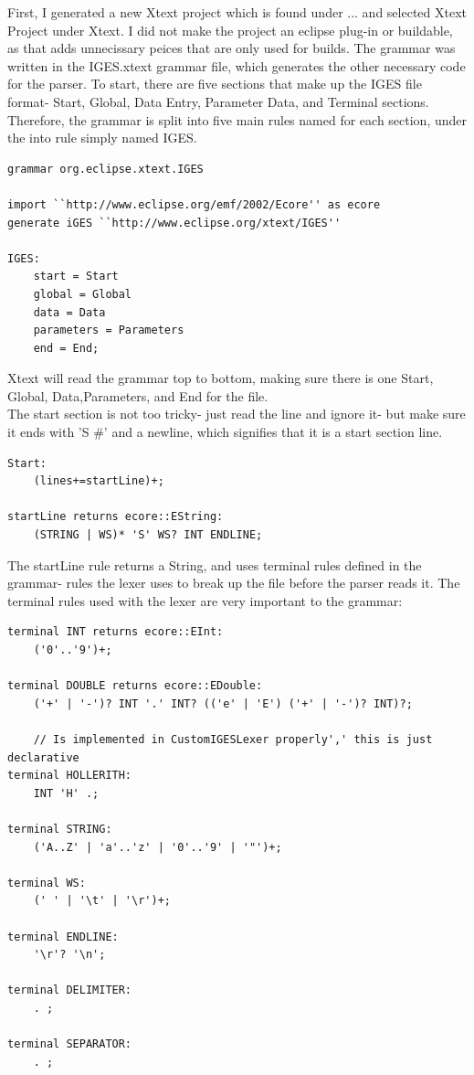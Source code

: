 First, I generated a new Xtext project which is found under ... and selected Xtext Project under Xtext. I did not make the project an eclipse plug-in or buildable, as that adds unnecissary peices that are only used for builds. The grammar was written in the IGES.xtext grammar file, which generates the other necessary code for the parser. To start, there are five sections that make up the IGES file format- Start, Global, Data Entry, Parameter Data, and Terminal sections. Therefore, the grammar is split into five main rules named for each section, under the into rule simply named IGES.
\newpage
\begin{Verbatim}
grammar org.eclipse.xtext.IGES

import ``http://www.eclipse.org/emf/2002/Ecore'' as ecore
generate iGES ``http://www.eclipse.org/xtext/IGES''

IGES:
    start = Start
    global = Global
    data = Data
    parameters = Parameters
    end = End;
\end{Verbatim}

Xtext will read the grammar top to bottom, making sure there is one Start, Global, Data,Parameters, and End for the file. \\

The start section is not too tricky- just read the line and ignore it- but make sure it ends with 'S      #' and a newline, which signifies that it is a start section line.

\begin{Verbatim}
Start:
    (lines+=startLine)+;

startLine returns ecore::EString:
    (STRING | WS)* 'S' WS? INT ENDLINE;
\end{Verbatim}

The startLine rule returns a String, and uses terminal rules defined in the grammar- rules the lexer uses to break up the file before the parser reads it. The terminal rules used with the lexer are very important to the grammar:

\begin{Verbatim}
terminal INT returns ecore::EInt:
    ('0'..'9')+;

terminal DOUBLE returns ecore::EDouble:
    ('+' | '-')? INT '.' INT? (('e' | 'E') ('+' | '-')? INT)?;

	// Is implemented in CustomIGESLexer properly',' this is just declarative
terminal HOLLERITH:
    INT 'H' .;

terminal STRING:
    ('A..Z' | 'a'..'z' | '0'..'9' | '"')+;

terminal WS:
    (' ' | '\t' | '\r')+;

terminal ENDLINE:
    '\r'? '\n';
	
terminal DELIMITER:
    . ;

terminal SEPARATOR:
    . ;
\end{Verbatim}

